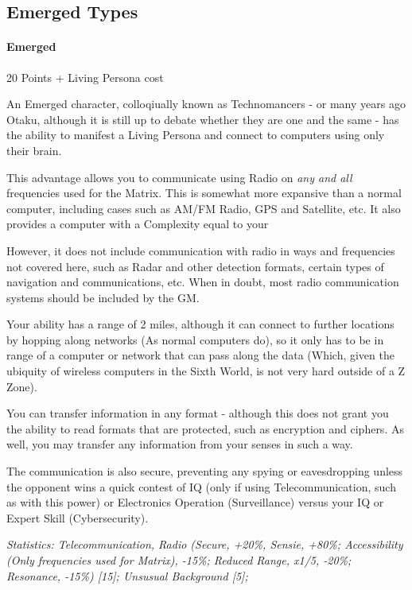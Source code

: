\begin{multicols*}{3}
	
	\subsection{Emerged Types}
	
	\paragraph{Emerged}
	\begin{flushright}
		20 Points + Living Persona cost
	\end{flushright}
	
	An Emerged character, colloqiually known as Technomancers - or many years ago Otaku, although it is still up to debate whether they are one and the same - has the ability to manifest a Living Persona and connect to computers using only their brain.
	
	This advantage allows you to communicate using Radio on \textit{any and all} frequencies used for the Matrix. This is somewhat more expansive than a normal computer, including cases such as AM/FM Radio, GPS and Satellite, etc. It also provides a computer with a Complexity equal to your
	
	However, it does not include communication with radio in ways and frequencies not covered here, such as Radar and other detection formats, certain types of navigation and communications, etc. When in doubt, most radio communication systems should be included by the GM.
	
	Your ability has a range of 2 miles, although it can connect to further locations by hopping along networks (As normal computers do), so it only has to be in range of a computer or network that can pass along the data (Which, given the ubiquity of wireless computers in the Sixth World, is not very hard outside of a Z Zone).
	
	You can transfer information in any format - although this does not grant you the ability to read formats that are protected, such as encryption and ciphers. As well, you may transfer any information from your senses in such a way.
	
	The communication is also secure, preventing any spying or eavesdropping unless the opponent wins a quick contest of IQ (only if using Telecommunication, such as with this power) or Electronics Operation (Surveillance) versus your IQ or Expert Skill (Cybersecurity).
	
	\textit{\textcolor{OliveGreen}{Statistics: Telecommunication, Radio (Secure, +20\%, Sensie, +80\%; Accessibility (Only frequencies used for Matrix), -15\%; Reduced Range, x1/5, -20\%; Resonance, -15\%) [15]; Unsusual Background [5];}}
	

\end{multicols*}
